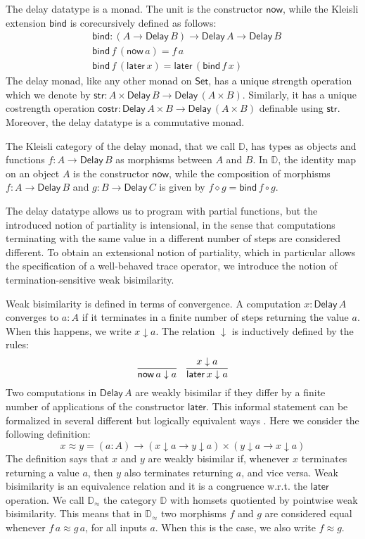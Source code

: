 \documentclass[runningheads]{llncs}
\newcommand{\Set}{\mathsf{Set}}
\newcommand{\comp}{\circ}
\newcommand{\Delay}{\mathsf{Delay}\,}
\newcommand{\now}{\mathsf{now}}
\newcommand{\later}{\mathsf{later}}
\newcommand{\dn}{\downarrow}
\newcommand{\bind}{\mathsf{bind}}
\newcommand{\str}{\mathsf{str}}
\newcommand{\costr}{\mathsf{costr}}
\newcommand{\D}{\mathbb{D}}
\newcommand{\Dapprox}{\mathbb{D}_{\approx}}
\begin{document}
The delay datatype is a monad. The unit is the constructor $\now$,
while the Kleisli extension $\bind$ is corecursively defined as follows:
\begin{align*}
& \bind : (A \to \Delay B) \to \Delay A \to \Delay B \\
& \bind \,f \, (\now\,a) = f\,a \\
& \bind\,f\,(\later\,x) = \later\,(\bind\,f\,x)
\end{align*}
The delay monad, like any other monad on $\Set$, has a unique strength
operation which we denote by $\str : A \times \Delay B \to \Delay (A
\times B)$. Similarly, it has a unique costrength operation $\costr :
\Delay A \times B \to \Delay (A \times B)$ definable using $\str$. Moreover, the delay datatype is a commutative monad.

The Kleisli category of the delay monad, that we call $\D$, has types
as objects and functions $f : A \to \Delay B$ as morphisms between $A$
and $B$. In $\D$, the identity map on an object $A$ is the constructor
$\now$, while the composition of morphisms $f : A \to \Delay B$ and $g
: B \to \Delay C$ is given by $f \diamond g = \bind\,f \comp g$.

The delay datatype allows us to program with partial functions, but
the introduced notion of partiality is intensional, in the sense that
computations terminating with the same value in a different number of
steps are considered different. To obtain an extensional notion of
partiality, which in particular allows the specification of a
well-behaved trace operator, we introduce the notion of termination-sensitive
weak bisimilarity.

Weak bisimilarity is defined in terms of convergence. A computation
$x : \Delay A$ converges to $a : A$ if it terminates in a finite
number of steps returning the value $a$. When this happens, we write
$x \dn a$. The relation $\dn$ is inductively defined by the rules:
\[
\infer{\now\,a \dn a}{}
\quad
\infer{\later\,x \dn a}{x \dn a}
\]
Two computations in $\Delay A$ are weakly bisimilar if they differ by
a finite number of applications of the constructor $\later$. This
informal statement can be formalized in several different but
logically equivalent ways \cite{ChapmanUV19}. Here we consider the
following definition:
\[
x \approx y = (a : A) \to (x \dn a \to y \dn a) \times (y \dn a \to x \dn a) 
\]
The definition says that $x$ and $y$ are weakly bisimilar if, whenever
$x$ terminates returning a value $a$, then $y$ also terminates
returning $a$, and vice versa. Weak bisimilarity is an equivalence
relation and it is a congruence w.r.t. the $\later$ operation.
We call $\Dapprox$ the category $\D$ with homsets
quotiented by pointwise weak bisimilarity. This means that in
$\Dapprox$ two morphisms $f$ and $g$ are considered equal whenever
$f \, a \approx g \, a$, for all inputs $a$. When this is the case, we
also write $f \approx g$. 
\end{document}
